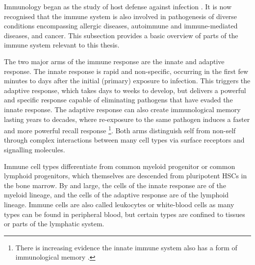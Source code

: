 Immunology began as the study of host defense against infection \autocite{murphy2016ChapterBasicConcepts}.
It is now recognised that the immune system is also involved in pathogenesis of diverse conditions encompassing allergic diseases, autoimmune and immune-mediated diseases, and cancer.
This subsection provides a basic overview of parts of the immune system relevant to this thesis.

The two major arms of the immune response are the innate and adaptive response.
The innate response is rapid and non-specific, 
occurring in the first few minutes to days after the initial (primary) exposure to infection.
This triggers the adaptive response, which takes days to weeks to develop, 
but delivers a powerful and specific response capable of eliminating pathogens that have evaded the innate response.
The adaptive response can also create immunological memory lasting years to decades,
where re-exposure to the same pathogen induces a faster and more powerful recall response%
\footnote{
    There is increasing evidence the innate immune system also has a form of immunological memory \autocite{dominguez-andres2020SpecificsInnateImmune}.
}.
Both arms distinguish self from non-self through complex interactions between many cell types via surface receptors and signalling molecules.

Immune cell types differentiate from common myeloid progenitor or common lymphoid progenitors,
which themselves are descended from pluripotent \glspl{HSC} in the bone marrow.
By and large, the cells of the innate response are of the myeloid lineage, 
and the cells of the adaptive response are of the lymphoid lineage.
Immune cells are also called leukocytes or white-blood cells as many types can be found in peripheral blood, 
but certain types are confined to tissues or parts of the lymphatic system.

